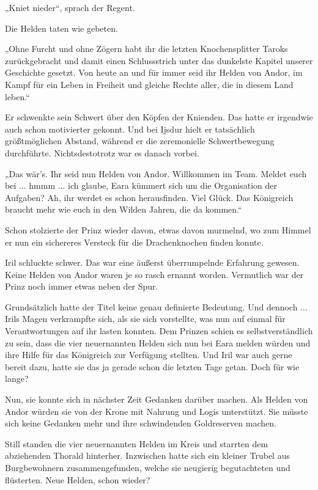 „Kniet nieder“, sprach der Regent.

Die Helden taten wie gebeten.

„Ohne Furcht und ohne Zögern habt ihr die letzten Knochensplitter Taroks zurückgebracht und damit einen Schlussstrich unter das dunkelste Kapitel unserer Geschichte gesetzt. Von heute an und für immer seid ihr Helden von Andor, im Kampf für ein Leben in Freiheit und gleiche Rechte aller, die in diesem Land leben.“

Er schwenkte sein Schwert über den Köpfen der Knienden. Das hatte er irgendwie auch schon motivierter gekonnt. Und bei Ijsdur hielt er tatsächlich größtmöglichen Abstand, während er die zeremonielle Schwertbewegung durchführte. Nichtsdestotrotz war es danach vorbei.

„Das wär’s. Ihr seid nun Helden von Andor. Willkommen im Team. Meldet euch bei ... hmmm ... ich glaube, Eara kümmert sich um die Organisation der Aufgaben? Ah, ihr werdet es schon herausfinden. Viel Glück. Das Königreich braucht mehr wie euch in den Wilden Jahren, die da kommen.“

Schon stolzierte der Prinz wieder davon, etwas davon murmelnd, wo zum Himmel er nun ein sichereres Versteck für die Drachenknochen finden konnte.

Iril schluckte schwer. Das war eine äußerst überrumpelnde Erfahrung gewesen. Keine Helden von Andor waren je so rasch ernannt worden. Vermutlich war der Prinz noch immer etwas neben der Spur.

Grundsätzlich hatte der Titel keine genau definierte Bedeutung. Und dennoch ... Irils Magen verkrampfte sich, als sie sich vorstellte, was nun auf einmal für Verantwortungen auf ihr lasten konnten. Dem Prinzen schien es selbstverständlich zu sein, dass die vier neuernannten Helden sich nun bei Eara melden würden und ihre Hilfe für das Königreich zur Verfügung stellten. Und Iril war auch gerne bereit dazu, hatte sie das ja gerade schon die letzten Tage getan. Doch für wie lange?

Nun, sie konnte sich in nächster Zeit Gedanken darüber machen. Als Helden von Andor würden sie von der Krone mit Nahrung und Logis unterstützt. Sie müsste sich keine Gedanken mehr und ihre schwindenden Goldreserven machen.

Still standen die vier neuernannten Helden im Kreis und starrten dem abziehenden Thorald hinterher. Inzwischen hatte sich ein kleiner Trubel aus Burgbewohnern zusammengefunden, welche sie neugierig begutachteten und flüsterten. Neue Helden, schon wieder?





